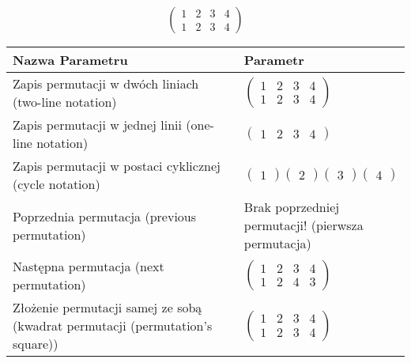 \documentclass[12pt]{article}
\begin{document}
\begin{center}
\[
\begin{pmatrix}
	1 & 2 & 3 & 4 \\ 
	1 & 2 & 3 & 4 
\end{pmatrix}
\]

\begin{tabular}{|m{0.6\linewidth}|m{0.4\linewidth}|}
	\hline
	Nazwa Parametru & Parametr \\
	\hline
	Zapis permutacji w dwóch liniach (two-line notation) & $\begin{pmatrix} 1 & 2 & 3 & 4 \\ 
1 & 2 & 3 & 4 \end{pmatrix}$ \\ 
	\hline
	Zapis permutacji w jednej linii (one-line notation) & $\begin{pmatrix} 1 & 2 & 3 & 4 \end{pmatrix}$ \\ 
	\hline
	Zapis permutacji w postaci cyklicznej (cycle notation) & $\begin{pmatrix} 1 \end{pmatrix} \begin{pmatrix} 2 \end{pmatrix} \begin{pmatrix} 3 \end{pmatrix} \begin{pmatrix} 4 \end{pmatrix} $ \\ 
	\hline
	Poprzednia permutacja (previous permutation) & Brak poprzedniej permutacji! (pierwsza permutacja)\\ 
	\hline
	Następna permutacja (next permutation) & $\begin{pmatrix} 1 & 2 & 3 & 4 \\ 
1 & 2 & 4 & 3 \end{pmatrix}$ \\ 
	\hline
	Złożenie permutacji samej ze sobą (kwadrat permutacji (permutation's square)) & $\begin{pmatrix} 1 & 2 & 3 & 4 \\ 
1 & 2 & 3 & 4 \end{pmatrix}$ \\ 
	\hline
\end{tabular}
\end{center}
\end{document}
